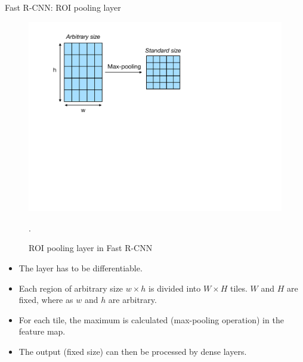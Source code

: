 \documentclass[xcolor=pdftex,dvipsnames,table]{beamer}
\begin{document}
\begin{frame}{Fast R-CNN: ROI pooling layer}
\begin{figure}[htb]
   \centering
   \includegraphics[height=0.4\textheight]{../graphics/ROI_pooling_layer.pdf}
   \caption{ROI pooling layer in Fast R-CNN}.
\end{figure}
\begin{itemize}
   \item The layer has to be differentiable. 
   \item Each region of arbitrary size $w \times h$ is divided into $W \times H$ tiles. $W$ and $H$ are fixed, where as $w$ and $h$ are arbitrary.
   \item For each tile, the maximum is calculated (max-pooling operation) in the feature map.
   \item The output (fixed size) can then be processed by dense layers. 
\end{itemize}
\end{frame}
\end{document}
